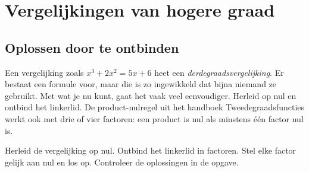 \begin{oefeningen}
\end{oefeningen}

\section{Vergelijkingen van hogere graad}

\subsection{Oplossen door te ontbinden}

Een vergelijking zoals $x^3 + 2x^2 = 5x + 6$ heet een \textit{derdegraadsvergelijking}. Er bestaat een formule voor, maar die is zo ingewikkeld dat bijna niemand ze gebruikt. Met wat je nu kunt, gaat het vaak veel eenvoudiger. Herleid op nul en ontbind het linkerlid. De product-nulregel uit het handboek Tweedegraadsfuncties werkt ook met drie of vier factoren: een product is nul als minstens één factor nul is.


\begin{werkwijze}
Herleid de vergelijking op nul. Ontbind het linkerlid in factoren. Stel elke factor gelijk aan nul en los op. Controleer de oplossingen in de opgave.
\end{werkwijze}

